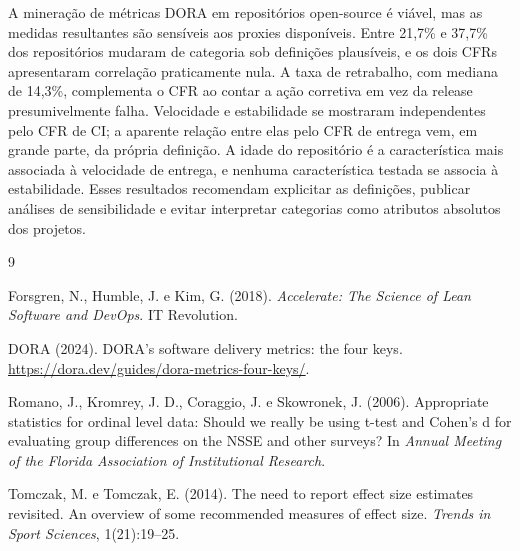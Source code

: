 \documentclass[12pt]{article}
\begin{document}
A mineração de métricas DORA em repositórios open-source é viável, mas as
medidas resultantes são sensíveis aos proxies disponíveis. Entre 21,7\% e
37,7\% dos repositórios mudaram de categoria sob definições plausíveis, e os
dois CFRs apresentaram correlação praticamente nula. A taxa de retrabalho,
com mediana de 14,3\%, complementa o CFR ao contar a ação corretiva em vez da
release presumivelmente falha. Velocidade e estabilidade se mostraram
independentes pelo CFR de CI; a aparente relação entre elas pelo CFR de
entrega vem, em grande parte, da própria definição. A idade do repositório é
a característica mais associada à velocidade de entrega, e nenhuma
característica testada se associa à estabilidade. Esses resultados
recomendam explicitar as definições, publicar análises de sensibilidade e
evitar interpretar categorias como atributos absolutos dos projetos.

\begin{thebibliography}{9}

Forsgren, N., Humble, J. e Kim, G. (2018).
\newblock \emph{Accelerate: The Science of Lean Software and DevOps}.
\newblock IT Revolution.

DORA (2024).
\newblock DORA's software delivery metrics: the four keys.
\newblock \url{https://dora.dev/guides/dora-metrics-four-keys/}.

Romano, J., Kromrey, J. D., Coraggio, J. e Skowronek, J. (2006).
\newblock Appropriate statistics for ordinal level data: Should we really be
using t-test and Cohen's d for evaluating group differences on the NSSE and
other surveys?
\newblock In \emph{Annual Meeting of the Florida Association of Institutional
Research}.

Tomczak, M. e Tomczak, E. (2014).
\newblock The need to report effect size estimates revisited. An overview of
some recommended measures of effect size.
\newblock \emph{Trends in Sport Sciences}, 1(21):19--25.

\end{thebibliography}
\end{document}
